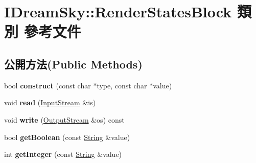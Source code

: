 \hypertarget{class_i_dream_sky_1_1_render_states_block}{}\section{I\+Dream\+Sky\+:\+:Render\+States\+Block 類別 參考文件}
\label{class_i_dream_sky_1_1_render_states_block}
\subsection*{公開方法(Public Methods)}
\begin{DoxyCompactItemize}
\item 
bool {\bfseries construct} (const char $\ast$type, const char $\ast$value)\hypertarget{class_i_dream_sky_1_1_render_states_block_add904a45d8fe2ff8b8b28cdd47a9ef1f}{}\label{class_i_dream_sky_1_1_render_states_block_add904a45d8fe2ff8b8b28cdd47a9ef1f}

\item 
void {\bfseries read} (\hyperlink{class_i_dream_sky_1_1_input_stream}{Input\+Stream} \&is)\hypertarget{class_i_dream_sky_1_1_render_states_block_ad932a134a13f754b6c42ac9ca3767a0c}{}\label{class_i_dream_sky_1_1_render_states_block_ad932a134a13f754b6c42ac9ca3767a0c}

\item 
void {\bfseries write} (\hyperlink{class_i_dream_sky_1_1_output_stream}{Output\+Stream} \&os) const \hypertarget{class_i_dream_sky_1_1_render_states_block_aca0ada59c389b983bcc3b083ad4a38bd}{}\label{class_i_dream_sky_1_1_render_states_block_aca0ada59c389b983bcc3b083ad4a38bd}

\item 
bool {\bfseries get\+Boolean} (const \hyperlink{class_i_dream_sky_1_1_string}{String} \&value)\hypertarget{class_i_dream_sky_1_1_render_states_block_a7e8a2347de2a7e667bea9c76b9ec9a07}{}\label{class_i_dream_sky_1_1_render_states_block_a7e8a2347de2a7e667bea9c76b9ec9a07}

\item 
int {\bfseries get\+Integer} (const \hyperlink{class_i_dream_sky_1_1_string}{String} \&value)\hypertarget{class_i_dream_sky_1_1_render_states_block_aa1b7df189aec1e9ebdc6265b1727cca3}{}\label{class_i_dream_sky_1_1_render_states_block_aa1b7df189aec1e9ebdc6265b1727cca3}

\end{DoxyCompactItemize}

